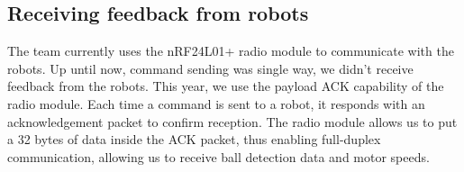 \subsection{Receiving feedback from robots}

The team currently uses the nRF24L01+ radio module to communicate with the robots.
Up until now, command sending was single way, we didn't receive feedback from the robots.
This year, we use the payload ACK capability of the radio module. Each time a command is sent
to a robot, it responds with an acknowledgement packet to confirm reception.
The radio module allows us to put a 32 bytes of data inside the ACK packet,
thus enabling full-duplex communication, allowing us to receive ball detection data
and motor speeds.